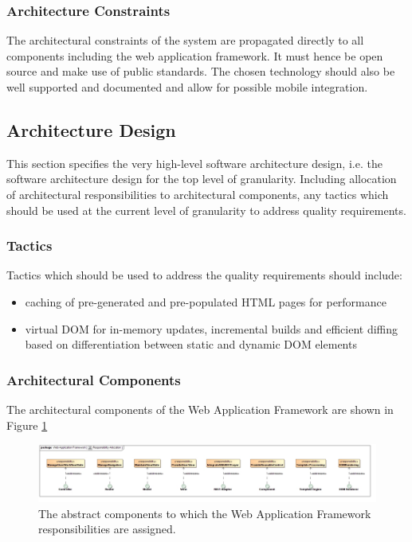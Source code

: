 \subsubsection{Architecture Constraints}
The architectural constraints of the system are propagated directly to all 
components including the web application framework. It must hence be open source
and make use of public standards. The chosen technology should also be well 
supported and documented and allow for possible mobile integration.

\subsection{Architecture Design}
This section specifies the very high-level software architecture design, i.e.
the software architecture design for the top level of granularity. Including 
allocation of architectural responsibilities to architectural components, any
tactics which should be used at the current level of granularity to address
quality requirements.

\subsubsection{Tactics}
Tactics which should be used to address the quality requirements should include:
\begin{itemize}
	\item caching of pre-generated and pre-populated HTML pages for performance
	\item virtual DOM for in-memory updates, incremental builds and efficient 
	diffing based on differentiation between static and dynamic DOM elements
\end{itemize}
\subsubsection{Architectural Components}
The architectural components of the  Web Application Framework are shown in Figure \ref{fig:webApplicationFrameworkResponsibilityAllocation}
\begin{figure}[H]
	\begin{center}
	\includegraphics[scale=0.35]{../Diagrams and Charts/Web Application Framework/ResponsibilityAllocation.jpg}
	\caption{The abstract components to which the Web Application Framework responsibilities are assigned.}
	\label{fig:webApplicationFrameworkResponsibilityAllocation}
	\end{center}
\end{figure}

